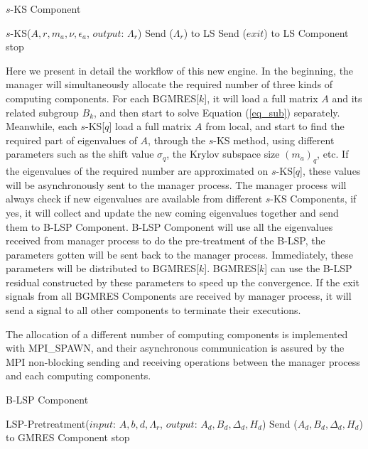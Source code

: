 \begin{algorithm}[h]
		\caption{$s$-KS Component} 
	\begin{algorithmic}[1]
		\State $s$-KS($A, r, m_a, \nu,\epsilon_a$, $output$: $\Lambda_r$)
		\State Send ($\Lambda_r$) to LS
		\State Send ($exit$) to LS Component  \State stop \EndIf
		\EndWhile
		\EndFunction
	\end{algorithmic}  
	\label{skspc}
\end{algorithm}

Here we present in detail the workflow of this new engine. In the beginning, the manager will simultaneously allocate the required number of three kinds of computing components. For each BGMRES[$k$], it will load a full matrix $A$ and its related subgroup $B_k$, and then start to solve Equation (\ref{eq_sub}) separately. Meanwhile, each $s$-KS[$q$] load a full matrix $A$ from local, and start to find the required part of eigenvalues of $A$, through the $s$-KS method, using different parameters such as the shift value $\sigma_q$, the Krylov subspace size $(m_a)_q$, etc. If the eigenvalues of the required number are approximated on $s$-KS[$q$], these values will be asynchronously sent to the manager process. The manager process will always check if new eigenvalues are available from different $s$-KS Components, if yes, it will collect and update the new coming eigenvalues together and send them to B-LSP Component. B-LSP Component will use all the eigenvalues received from manager process to do the pre-treatment of the B-LSP, the parameters gotten will be sent back to the manager process. Immediately, these parameters will be distributed to BGMRES[$k$]. BGMRES[$k$] can use the B-LSP residual constructed by these parameters to speed up the convergence. If the exit signals from all BGMRES Components are received by manager process, it will send a signal to all other components to terminate their executions.

The allocation of a different number of computing components is implemented with MPI\_SPAWN, and their asynchronous communication is assured by the MPI non-blocking sending and receiving operations between the manager process and each computing components.

\begin{algorithm}[h]
	\caption{B-LSP Component}   
	\begin{algorithmic}[1]
		\State LSP-Pretreatment{($input$: $A,b,d,\Lambda_r$, $output$: $A_d, B_d, \Delta_d, H_d$)}
		\State Send ($A_d, B_d, \Delta_d, H_d$) to GMRES Component
		\EndIf
		\State stop \EndIf
		\EndFunction
	\end{algorithmic}  
	\label{blspc}
\end{algorithm}

